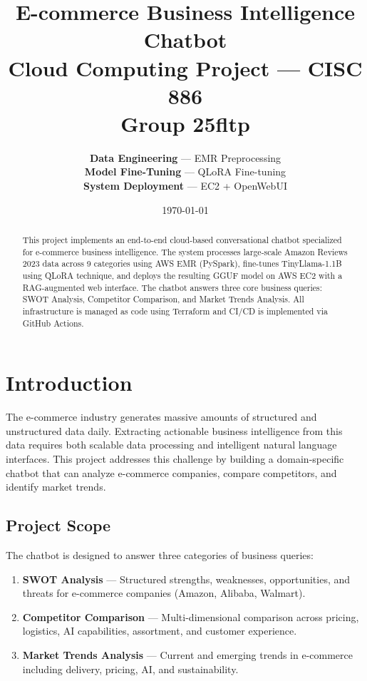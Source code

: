\documentclass[12pt,a4paper]{article}
\title{\textbf{E-commerce Business Intelligence Chatbot}\\
\large Cloud Computing Project — CISC 886\\
Group 25fltp}
\author{
    \textbf{Data Engineering} — EMR Preprocessing\\
    \textbf{Model Fine-Tuning} — QLoRA Fine-tuning\\
    \textbf{System Deployment} — EC2 + OpenWebUI
}
\date{\today}
\begin{document}
\maketitle
\thispagestyle{empty}
\vspace{1em}

\begin{abstract}
This project implements an end-to-end cloud-based conversational chatbot specialized for e-commerce business intelligence. The system processes large-scale Amazon Reviews 2023 data across 9 categories using AWS EMR (PySpark), fine-tunes TinyLlama-1.1B using QLoRA technique, and deploys the resulting GGUF model on AWS EC2 with a RAG-augmented web interface. The chatbot answers three core business queries: SWOT Analysis, Competitor Comparison, and Market Trends Analysis. All infrastructure is managed as code using Terraform and CI/CD is implemented via GitHub Actions.
\end{abstract}

\section{Introduction}
\label{sec:intro}

The e-commerce industry generates massive amounts of structured and unstructured data daily. Extracting actionable business intelligence from this data requires both scalable data processing and intelligent natural language interfaces. This project addresses this challenge by building a domain-specific chatbot that can analyze e-commerce companies, compare competitors, and identify market trends.

\subsection{Project Scope}

The chatbot is designed to answer three categories of business queries:

\begin{enumerate}
    \item \textbf{SWOT Analysis} — Structured strengths, weaknesses, opportunities, and threats for e-commerce companies (Amazon, Alibaba, Walmart).
    \item \textbf{Competitor Comparison} — Multi-dimensional comparison across pricing, logistics, AI capabilities, assortment, and customer experience.
    \item \textbf{Market Trends Analysis} — Current and emerging trends in e-commerce including delivery, pricing, AI, and sustainability.
\end{enumerate}
\end{document}
